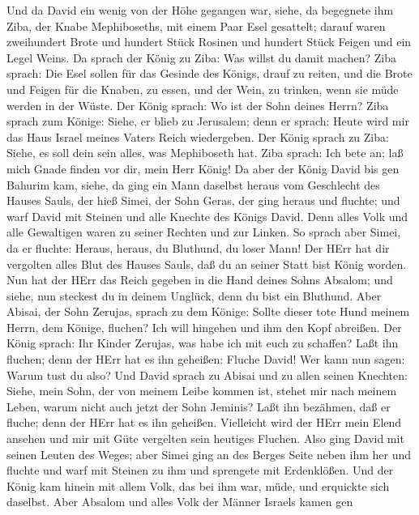  Und da David ein wenig von der Höhe gegangen war, siehe, da
begegnete ihm Ziba, der Knabe Mephiboseths, mit einem Paar Esel
gesattelt; darauf waren zweihundert Brote und hundert Stück Rosinen und
hundert Stück Feigen und ein Legel Weins.  Da sprach der
König zu Ziba: Was willst du damit machen? Ziba sprach: Die Esel sollen
für das Gesinde des Königs, drauf zu reiten, und die Brote und Feigen
für die Knaben, zu essen, und der Wein, zu trinken, wenn sie müde werden
in der Wüste.  Der König sprach: Wo ist der Sohn deines
Herrn? Ziba sprach zum Könige: Siehe, er blieb zu Jerusalem; denn er
sprach: Heute wird mir das Haus Israel meines Vaters Reich wiedergeben.
 Der König sprach zu Ziba: Siehe, es soll dein sein alles,
was Mephiboseth hat. Ziba sprach: Ich bete an; laß mich Gnade finden vor
dir, mein Herr König!  Da aber der König David bis gen
Bahurim kam, siehe, da ging ein Mann daselbst heraus vom Geschlecht des
Hauses Sauls, der hieß Simei, der Sohn Geras, der ging heraus und
fluchte;  und warf David mit Steinen und alle Knechte des
Königs David. Denn alles Volk und alle Gewaltigen waren zu seiner
Rechten und zur Linken.  So sprach aber Simei, da er
fluchte: Heraus, heraus, du Bluthund, du loser Mann!  Der
HErr hat dir vergolten alles Blut des Hauses Sauls, daß du an seiner
Statt bist König worden. Nun hat der HErr das Reich gegeben in die Hand
deines Sohns Absalom; und siehe, nun steckest du in deinem Unglück, denn
du bist ein Bluthund.  Aber Abisai, der Sohn Zerujas, sprach
zu dem Könige: Sollte dieser tote Hund meinem Herrn, dem Könige,
fluchen? Ich will hingehen und ihm den Kopf abreißen.  Der
König sprach: Ihr Kinder Zerujas, was habe ich mit euch zu schaffen?
Laßt ihn fluchen; denn der HErr hat es ihn geheißen: Fluche David! Wer
kann nun sagen: Warum tust du also?  Und David sprach zu
Abisai und zu allen seinen Knechten: Siehe, mein Sohn, der von meinem
Leibe kommen ist, stehet mir nach meinem Leben, warum nicht auch jetzt
der Sohn Jeminis? Laßt ihn bezähmen, daß er fluche; denn der HErr hat es
ihn geheißen.  Vielleicht wird der HErr mein Elend ansehen
und mir mit Güte vergelten sein heutiges Fluchen.  Also
ging David mit seinen Leuten des Weges; aber Simei ging an des Berges
Seite neben ihm her und fluchte und warf mit Steinen zu ihm und
sprengete mit Erdenklößen.  Und der König kam hinein mit
allem Volk, das bei ihm war, müde, und erquickte sich daselbst.
 Aber Absalom und alles Volk der Männer Israels kamen gen

